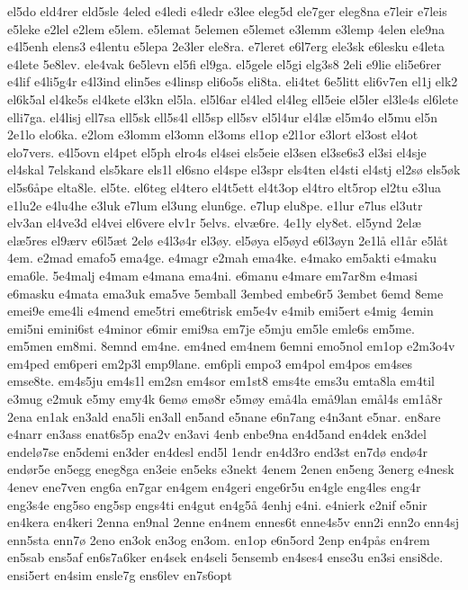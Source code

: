 el5do
eld4rer
eld5sle
4eled
e4ledi
e4ledr
e3lee
eleg5d
ele7ger
eleg8na
e7leir
e7leis
e5leke
e2lel
e2lem
e5lem.
e5lemat
5elemen
e5lemet
e3lemm
e3lemp
4elen
ele9na
e4l5enh
elens3
e4lentu
e5lepa
2e3ler
ele8ra.
e7leret
e6l7erg
ele3sk
e6lesku
e4leta
e4lete
5e8lev.
ele4vak
6e5levn
el5fi
el9ga.
el5gele
el5gi
elg3s8
2eli
e9lie
eli5e6rer
e4lif
e4li5g4r
e4l3ind
elin5es
e4linsp
eli6o5s
eli8ta.
eli4tet
6e5litt
eli6v7en
el1j
elk2
el6k5al
el4ke5s
el4kete
el3kn
el5la.
el5l6ar
el4led
el4leg
ell5eie
el5ler
el3le4s
el6lete
elli7ga.
el4lisj
ell7sa
ell5sk
ell5s4l
ell5sp
ell5sv
el5l4ur
el4l^^e6
el5m4o
el5mu
el5n
2e1lo
elo6ka.
e2lom
e3lomm
el3omn
el3oms
el1op
e2l1or
e3lort
el3ost
el4ot
elo7vers.
e4l5ovn
el4pet
el5ph
elro4s
el4sei
els5eie
el3sen
el3se6s3
el3si
el4sje
el4skal
7elskand
els5kare
els1l
el6sno
el4spe
el3spr
els4ten
el4sti
el4stj
el2s^^f8
els5^^f8k
el5s6^^e5pe
elta8le.
el5te.
el6teg
el4tero
el4t5ett
el4t3op
el4tro
elt5rop
el2tu
e3lua
e1lu2e
e4lu4he
e3luk
e7lum
el3ung
elun6ge.
e7lup
elu8pe.
e1lur
e7lus
el3utr
elv3an
el4ve3d
el4vei
el6vere
elv1r
5elvs.
elv^^e66re.
4e1ly
ely8et.
el5ynd
2el^^e6
el^^e65res
el9^^e6rv
e6l5^^e6t
2el^^f8
e4l3^^f84r
el3^^f8y.
el5^^f8ya
el5^^f8yd
e6l3^^f8yn
2e1l^^e5
el1^^e5r
e5l^^e5t
4em.
e2mad
emafo5
ema4ge.
e4magr
e2mah
ema4ke.
e4mako
em5akti
e4maku
ema6le.
5e4malj
e4mam
e4mana
ema4ni.
e6manu
e4mare
em7ar8m
e4masi
e6masku
e4mata
ema3uk
ema5ve
5emball
3embed
embe6r5
3embet
6emd
8eme
emei9e
eme4li
e4mend
eme5tri
eme6trisk
em5e4v
e4mib
emi5ert
e4mig
4emin
emi5ni
emini6st
e4minor
e6mir
emi9sa
em7je
e5mju
em5le
emle6s
em5me.
em5men
em8mi.
8emnd
em4ne.
em4ned
em4nem
6emni
emo5nol
em1op
e2m3o4v
em4ped
em6peri
em2p3l
emp9lane.
em6pli
empo3
em4pol
em4pos
em4ses
emse8te.
em4s5ju
em4s1l
em2sn
em4sor
em1st8
ems4te
ems3u
emta8la
em4til
e3mug
e2muk
e5my
emy4k
6em^^f8
em^^f88r
e5m^^f8y
em^^e54la
em^^e59lan
em^^e5l4s
em1^^e58r
2ena
en1ak
en3ald
ena5li
en3all
en5and
e5nane
e6n7ang
e4n3ant
e5nar.
en8are
e4narr
en3ass
enat6s5p
ena2v
en3avi
4enb
enbe9na
en4d5and
en4dek
en3del
endel^^f87se
en5demi
en3der
en4desl
end5l
1endr
en4d3ro
end3st
en7d^^f8
end^^f84r
end^^f8r5e
en5egg
eneg8ga
en3eie
en5eks
e3nekt
4enem
2enen
en5eng
3energ
e4nesk
4enev
ene7ven
eng6a
en7gar
en4gem
en4geri
enge6r5u
en4gle
eng4les
eng4r
eng3s4e
eng5so
eng5sp
engs4ti
en4gut
en4g5^^e5
4enhj
e4ni.
e4nierk
e2nif
e5nir
en4kera
en4keri
2enna
en9nal
2enne
en4nem
ennes6t
enne4s5v
enn2i
enn2o
enn4sj
enn5sta
enn7^^f8
2eno
en3ok
en3og
en3om.
en1op
e6n5ord
2enp
en4p^^e5s
en4rem
en5sab
ens5af
en6s7a6ker
en4sek
en4seli
5ensemb
en4ses4
ense3u
en3si
ensi8de.
ensi5ert
en4sim
ensle7g
ens6lev
en7s6opt
